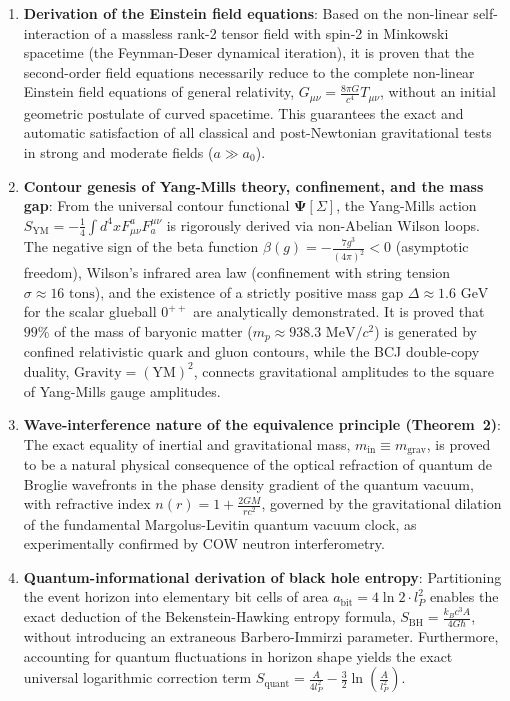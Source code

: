 \begin{enumerate}
\item \textbf{Derivation of the Einstein field equations}: Based on the non-linear self-interaction of a massless rank-2 tensor field with spin-2 in Minkowski spacetime (the Feynman-Deser dynamical iteration), it is proven that the second-order field equations necessarily reduce to the complete non-linear Einstein field equations of general relativity, $G_{\mu\nu} = \frac{8\pi G}{c^4} T_{\mu\nu}$, without an initial geometric postulate of curved spacetime. This guarantees the exact and automatic satisfaction of all classical and post-Newtonian gravitational tests in strong and moderate fields ($a \gg a_0$).

\item \textbf{Contour genesis of Yang-Mills theory, confinement, and the mass gap}: From the universal contour functional $\mathbf{\Psi}[\Sigma]$, the Yang-Mills action $S_{\text{YM}} = -\frac{1}{4}\int d^4x F_{\mu\nu}^a F^{\mu\nu}_a$ is rigorously derived via non-Abelian Wilson loops. The negative sign of the beta function $\beta(g) = -\frac{7g^3}{(4\pi)^2} < 0$ (asymptotic freedom), Wilson's infrared area law (confinement with string tension $\sigma \approx 16\text{ tons}$), and the existence of a strictly positive mass gap $\Delta \approx 1.6\text{ GeV}$ for the scalar glueball $0^{++}$ are analytically demonstrated. It is proved that $99\%$ of the mass of baryonic matter ($m_p \approx 938.3\text{ MeV}/c^2$) is generated by confined relativistic quark and gluon contours, while the BCJ double-copy duality, $\text{Gravity} = (\text{YM})^2$, connects gravitational amplitudes to the square of Yang-Mills gauge amplitudes.

\item \textbf{Wave-interference nature of the equivalence principle (Theorem~2)}: The exact equality of inertial and gravitational mass, $m_{\text{in}} \equiv m_{\text{grav}}$, is proved to be a natural physical consequence of the optical refraction of quantum de Broglie wavefronts in the phase density gradient of the quantum vacuum, with refractive index $n(r) = 1 + \frac{2GM}{r c^2}$, governed by the gravitational dilation of the fundamental Margolus-Levitin quantum vacuum clock, as experimentally confirmed by COW neutron interferometry.

\item \textbf{Quantum-informational derivation of black hole entropy}: Partitioning the event horizon into elementary bit cells of area $a_{\text{bit}} = 4\ln 2 \cdot l_P^2$ enables the exact deduction of the Bekenstein-Hawking entropy formula, $S_{\text{BH}} = \frac{k_B c^3 A}{4 G \hbar}$, without introducing an extraneous Barbero-Immirzi parameter. Furthermore, accounting for quantum fluctuations in horizon shape yields the exact universal logarithmic correction term $S_{\text{quant}} = \frac{A}{4 l_P^2} - \frac{3}{2}\ln\left(\frac{A}{l_P^2}\right)$.


\end{enumerate}
